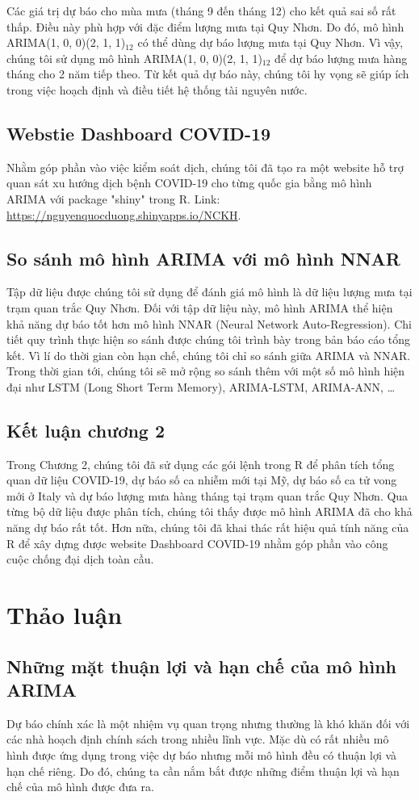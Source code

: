 \documentclass[12pt, a4paper,oneside]{book}
\theoremstyle{definition}
\begin{document}
Các giá trị dự báo cho mùa mưa (tháng 9 đến tháng 12) cho kết quả sai số rất thấp. Điều này phù hợp với đặc điểm lượng mưa tại Quy Nhơn. Do đó, mô hình ARIMA(1, 0, 0)(2, 1, 1)$_{12}$ có thể dùng dự báo lượng mưa tại Quy Nhơn. Vì vậy, chúng tôi sử dụng mô hình ARIMA(1, 0, 0)(2, 1, 1)$_{12}$ để dự báo lượng mưa hàng tháng cho 2 năm tiếp theo. Từ kết quả dự báo này, chúng tôi hy vọng sẽ giúp ích trong việc hoạch định và điều tiết hệ thống tài nguyên nước.
\section{Webstie Dashboard COVID-19}
Nhằm góp phần vào việc kiểm soát dịch, chúng tôi đã tạo ra một website hỗ trợ quan sát xu hướng dịch bệnh COVID-19 cho từng quốc gia bằng mô hình ARIMA với package "shiny" trong R. Link: \url{https://nguyenquocduong.shinyapps.io/NCKH}.
\section{So sánh mô hình ARIMA với mô hình NNAR}
Tập dữ liệu được chúng tôi sử dụng để đánh giá mô hình là dữ liệu lượng mưa tại trạm quan trắc Quy Nhơn. Đối với tập dữ liệu này, mô hình ARIMA thể hiện khả năng dự báo tốt hơn mô hình NNAR (Neural Network Auto-Regression). Chi tiết quy trình thực hiện so sánh được chúng tôi trình bày trong bản báo cáo tổng kết. Vì lí do thời gian còn hạn chế, chúng tôi chỉ so sánh giữa ARIMA và NNAR. Trong thời gian tới, chúng tôi sẽ mở rộng so sánh thêm với một số mô hình hiện đại như LSTM (Long Short Term Memory), ARIMA-LSTM, ARIMA-ANN, \dots
\section*{Kết luận chương 2}
Trong Chương 2, chúng tôi đã sử dụng các gói lệnh trong R để phân tích tổng quan dữ liệu COVID-19, dự báo số ca nhiễm mới tại Mỹ, dự báo số ca tử vong mới ở Italy và dự báo lượng mưa hàng tháng tại trạm quan trắc Quy Nhơn. Qua từng bộ dữ liệu được phân tích, chúng tôi thấy được mô hình ARIMA đã cho khả năng dự báo rất tốt. Hơn nữa, chúng tôi đã khai thác rất hiệu quả tính năng của R để xây dựng được website Dashboard COVID-19 nhằm góp phần vào công cuộc chống đại dịch toàn cầu.
\chapter*{Thảo luận}
\section*{Những mặt thuận lợi và hạn chế của mô hình ARIMA}
Dự báo chính xác là một nhiệm vụ quan trọng nhưng thường là khó khăn đối với các nhà hoạch định chính sách trong nhiều lĩnh vực. Mặc dù có rất nhiều mô hình được ứng dụng trong việc dự báo nhưng mỗi mô hình đều có thuận lợi và hạn chế riêng. Do đó, chúng ta cần nắm bắt được những điểm thuận lợi và hạn chế của mô hình được đưa ra.
\end{document}
